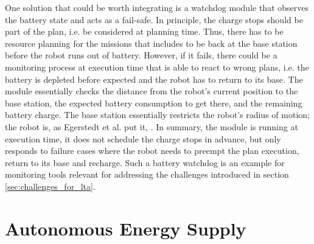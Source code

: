\documentclass[english, master, utf8]{base/thesis_KBS}
\begin{document}
One solution that could be worth integrating is a watchdog module that observes the battery state and acts as a fail-safe. In principle, the charge stops should
be part of the plan, i.e. be considered at planning time. Thus, there has to be resource planning for the missions that includes to be back at the base station before
the robot runs out of battery. However, if it fails, there could be a monitoring process at execution time that is able to react to wrong plans, i.e. the battery is
depleted before expected and the robot has to return to its base. The module essentially checks the distance from the robot's current position to the base station, 
the expected battery consumption to get there, and the remaining battery charge. The base station essentially restricts the robot's radius of motion; the robot is,
as Egerstedt et al. put it, . \cite{Egerstedt:2018} In summary, the module is running at execution time, it does not schedule the
charge stops in advance, but only responds to failure cases where the robot needs to preempt the plan execution, return to its base and recharge.
Such a battery watchdog is an example for monitoring tools relevant for addressing the challenges introduced in section \ref{sec:challenges_for_lta}.

\vfill
\pagebreak

\section{Autonomous Energy Supply}
\label{sec:docking_solution}
\end{document}
